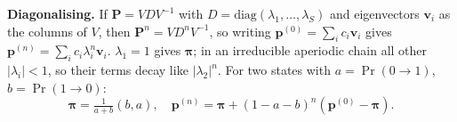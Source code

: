 \textbf{Diagonalising.} If $\mathbf P = VDV^{-1}$ with $D = \mathrm{diag}(\lambda_1, \dots, \lambda_S)$ and eigenvectors $\mathbf v_i$ as the columns of $V$,
then $\mathbf P^n = VD^nV^{-1}$, so writing $\mathbf p^{(0)} = \sum_i c_i \mathbf v_i$ gives $\mathbf p^{(n)} = \sum_i c_i \lambda_i^n \mathbf v_i$.
$\lambda_1 = 1$ gives $\mathbf{\pi}$; in an irreducible aperiodic chain all other $|\lambda_i| < 1$, so their terms decay like $|\lambda_2|^n$.
For two states with $a = \Pr(0 \to 1)$, $b = \Pr(1 \to 0)$:
\[ \mathbf{\pi} = \tfrac{1}{a+b}(b, a), \quad \mathbf p^{(n)} = \mathbf{\pi} + (1-a-b)^n(\mathbf p^{(0)} - \mathbf{\pi}). \]
